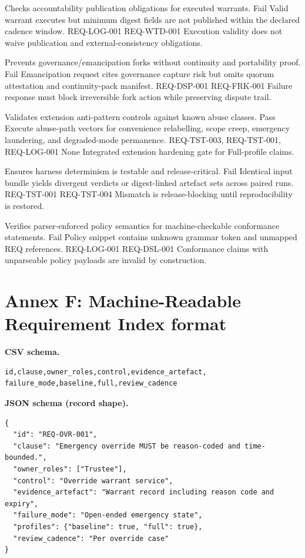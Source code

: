 \documentclass[11pt]{article}
\theoremstyle{definition}
\theoremstyle{plain}
\theoremstyle{remark}
\begin{document}
{Checks accountability publication obligations for executed warrants.}
{Fail}
{Valid warrant executes but minimum digest fields are not published within the declared cadence window.}
{REQ-LOG-001}
{REQ-WTD-001}
{Execution validity does not waive publication and external-consistency obligations.}

{Prevents governance/emancipation forks without continuity and portability proof.}
{Fail}
{Emancipation request cites governance capture risk but omits quorum attestation and continuity-pack manifest.}
{REQ-DSP-001}
{REQ-FRK-001}
{Failure response must block irreversible fork action while preserving dispute trail.}

{Validates extension anti-pattern controls against known abuse classes.}
{Pass}
{Execute abuse-path vectors for convenience relabelling, scope creep, emergency laundering, and degraded-mode permanence.}
{REQ-TST-003, REQ-TST-001, REQ-LOG-001}
{None}
{Integrated extension hardening gate for Full-profile claims.}

{Ensures harness determinism is testable and release-critical.}
{Fail}
{Identical input bundle yields divergent verdicts or digest-linked artefact sets across paired runs.}
{REQ-TST-001}
{REQ-TST-004}
{Mismatch is release-blocking until reproducibility is restored.}

{Verifies parser-enforced policy semantics for machine-checkable conformance statements.}
{Fail}
{Policy snippet contains unknown grammar token and unmapped REQ references.}
{REQ-LOG-001}
{REQ-DSL-001}
{Conformance claims with unparseable policy payloads are invalid by construction.}

\section{Annex F: Machine-Readable Requirement Index format}
\label{ann:machine-index}

\textbf{CSV schema.}
\begin{verbatim}
id,clause,owner_roles,control,evidence_artefact,
failure_mode,baseline,full,review_cadence
\end{verbatim}

\textbf{JSON schema (record shape).}
\begin{verbatim}
{
  "id": "REQ-OVR-001",
  "clause": "Emergency override MUST be reason-coded and time-bounded.",
  "owner_roles": ["Trustee"],
  "control": "Override warrant service",
  "evidence_artefact": "Warrant record including reason code and expiry",
  "failure_mode": "Open-ended emergency state",
  "profiles": {"baseline": true, "full": true},
  "review_cadence": "Per override case"
}
\end{verbatim}
\end{document}
